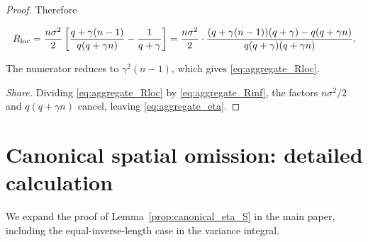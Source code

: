 \begin{proof}
Therefore

\[
R_{\rm loc}=\frac{n\sigma^2}{2}\left[\frac{q+\gamma(n-1)}{q(q+\gamma n)}-\frac{1}{q+\gamma}\right]=\frac{n\sigma^2}{2}\cdot\frac{(q+\gamma(n-1))(q+\gamma)-q(q+\gamma n)}{q(q+\gamma)(q+\gamma n)} .
\]

The numerator reduces to $\gamma^2(n-1)$, which gives \eqref{eq:aggregate_Rloc}.

\emph{Share.} Dividing \eqref{eq:aggregate_Rloc} by \eqref{eq:aggregate_Rinf}, the factors $n\sigma^2/2$ and $q(q+\gamma n)$ cancel, leaving \eqref{eq:aggregate_eta}.

\end{proof}

\section{Canonical spatial omission: detailed calculation}
\label{supp:canonical}
We expand the proof of Lemma~\ref{prop:canonical_eta_S} in the main paper,
including the equal-inverse-length case in the variance integral.
